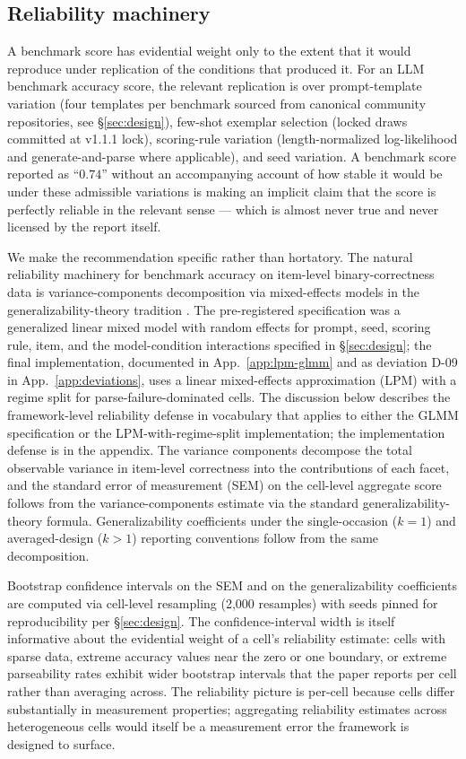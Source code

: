 \documentclass[11pt]{article}
\begin{document}
\subsection{Reliability machinery}
\label{sec:reliability-machinery}


A benchmark score has evidential weight only to the extent that it
would reproduce under replication of the conditions that produced
it. For an LLM benchmark accuracy score, the relevant replication
is over prompt-template variation (four templates per benchmark
sourced from canonical community repositories, see
§\ref{sec:design}), few-shot exemplar selection (locked draws
committed at v1.1.1 lock), scoring-rule variation
(length-normalized log-likelihood and generate-and-parse where
applicable), and seed variation. A
benchmark score reported as ``$0.74$'' without an accompanying
account of how stable it would be under these admissible variations
is making an implicit claim that the score is perfectly reliable in
the relevant sense --- which is almost never true and never licensed
by the report itself.

We make the recommendation specific rather than hortatory. The
natural reliability machinery for benchmark accuracy on item-level
binary-correctness data is variance-components decomposition via
mixed-effects models in the generalizability-theory tradition
\citep{brennan2001gtheory, cronbach1951alpha, shrout1979icc}.
The pre-registered specification was a generalized linear mixed
model with random effects for prompt, seed, scoring rule, item,
and the model-condition interactions specified in
§\ref{sec:design}; the final implementation, documented in
App.~\ref{app:lpm-glmm} and as deviation D-09 in
App.~\ref{app:deviations}, uses a linear mixed-effects
approximation (LPM) with a regime split for parse-failure-dominated
cells. The discussion below describes the framework-level reliability
defense in vocabulary that applies to either the GLMM specification
or the LPM-with-regime-split implementation; the implementation
defense is in the appendix. The variance components decompose
the total observable variance in item-level correctness into the
contributions of each facet, and the standard error of measurement
(SEM) on the cell-level aggregate score follows from the
variance-components estimate via the standard
generalizability-theory formula. Generalizability coefficients
under the single-occasion ($k = 1$) and averaged-design ($k > 1$)
reporting conventions follow from the same decomposition.

Bootstrap confidence intervals on the SEM and on the
generalizability coefficients are computed via cell-level
resampling (2,000 resamples) with seeds pinned for reproducibility
per §\ref{sec:design}. The confidence-interval width is itself
informative about the evidential weight of a cell's reliability
estimate: cells with sparse data, extreme accuracy values near the
zero or one boundary, or extreme parseability rates exhibit wider
bootstrap intervals that the paper reports per cell rather than
averaging across. The reliability picture is per-cell because cells
differ substantially in measurement properties; aggregating
reliability estimates across heterogeneous cells would itself be a
measurement error the framework is designed to surface.
\end{document}
